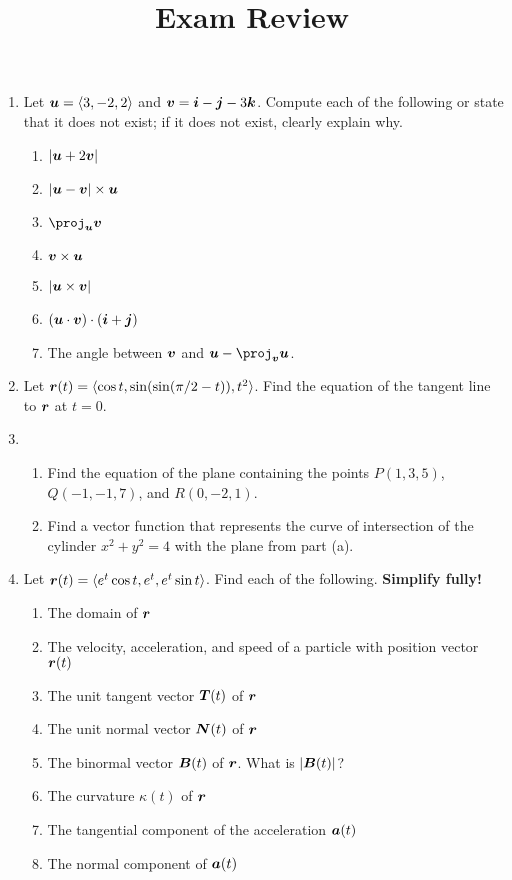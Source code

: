 \documentclass[12pt]{article}
\title{\vspace{-0.75in}\Huge{Exam Review}\vspace{-0.5in}}
\date{}
\newcommand{\compslong}[3]{\langle #1, #2, #3\rangle}
\begin{document}
	\maketitle
	
	\begin{enumerate}
		\item Let $\vect{u}=\compslong{3}{-2}{2}$ and $\boldsymbol{v}=\boldsymbol{i}-\boldsymbol{j}-3\boldsymbol{k}$. Compute each of the following or state that it does not exist; if it does not exist, clearly explain why.
		\begin{enumerate}
			\item $|\boldsymbol{u}+2\boldsymbol{v}|$
			\item $|\boldsymbol{u}-\boldsymbol{v}|\times\boldsymbol{u}$
			\item $\proj_{\vect{u}}{\vect{v}}$
			\item $\boldsymbol{v}\times\boldsymbol{u}$
			\item $|\boldsymbol{u}\times\boldsymbol{v}|$
			\item $(\boldsymbol{u}\cdot\boldsymbol{v})\cdot(\boldsymbol{i}+\boldsymbol{j})$
			\item The angle between $\boldsymbol{v}$ and $\vect{u}-\proj_{\vect{v}}{\vect{u}}$.
		\end{enumerate}
	
		\item Let $\boldsymbol{r}(t)=\langle\cos{t},\sin(\sin(\pi/2-t)),t^2\rangle$. Find the equation of the tangent line to $\boldsymbol{r}$ at $t=0$.
	
		\item \begin{enumerate}
			\item Find the equation of the plane containing the points $P(1,3,5)$, $Q(-1,-1,7)$, and $R(0,-2,1)$.
			\item Find a vector function that represents the curve of intersection of the cylinder $x^2+y^2=4$ with the plane from part (a).
		\end{enumerate}
	
		\item Let $\vect{r}(t)=\compslong{e^t\cos{t}}{e^t}{e^t\sin{t}}$. Find each of the following. \textbf{Simplify fully!}
		\begin{enumerate}
			\item The domain of $\boldsymbol{r}$
			\item The velocity, acceleration, and speed of a particle with position vector $\boldsymbol{r}(t)$
			\item The unit tangent vector $\boldsymbol{T}(t)$ of $\boldsymbol{r}$
			\item The unit normal vector $\boldsymbol{N}(t)$ of $\boldsymbol{r}$
			\item The binormal vector $\boldsymbol{B}(t)$ of $\boldsymbol{r}$. What is $|\boldsymbol{B}(t)|$?
			\item The curvature $\kappa(t)$ of $\boldsymbol{r}$
			\item The tangential component of the acceleration $\boldsymbol{a}(t)$
			\item The normal component of $\boldsymbol{a}(t)$
		\end{enumerate}
	\end{enumerate}
\end{document}
